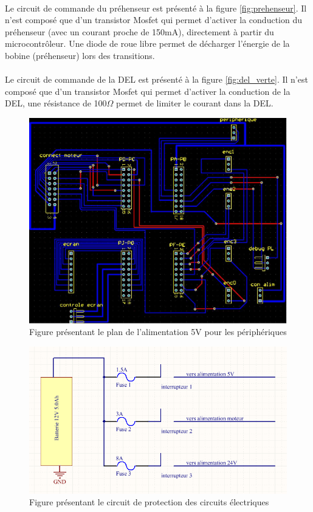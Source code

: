 \paragraph{}Le circuit de commande du préhenseur est présenté à la figure \ref{fig:prehenseur}. Il n'est composé que d'un transistor Mosfet qui permet d'activer la conduction du préhenseur (avec un courant proche de 150mA), directement à partir du microcontrôleur. Une diode de roue libre permet de décharger l'énergie de la bobine (préhenseur) lors des transitions.
\paragraph{}Le circuit de commande de la DEL est présenté à la figure \ref{fig:del_verte}. Il n'est composé que d'un transistor Mosfet qui permet d'activer la conduction de la DEL, une résistance de 100$\Omega$ permet de limiter le courant dans la DEL.

\begin{figure}
\centering
\includegraphics[scale=0.5]{fig/plan_micro.jpg}
\caption{Figure présentant le plan de l'alimentation 5V pour les périphériques}
\label{fig:plan_micro}
\end{figure}

\begin{figure}
\centering
\includegraphics[scale=0.5]{fig/plan_circuit_protection.png}
\caption{Figure présentant le circuit de protection des circuits électriques}
\label{fig:protection}
\end{figure}

